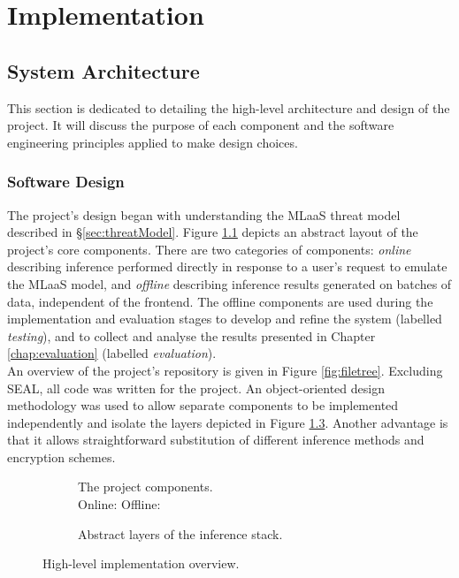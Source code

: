 \chapter{Implementation}
\label{chap:implementation}


\section{System Architecture}
\indent \indent
This section is dedicated to detailing the high-level architecture and design of the project. It will discuss the purpose of each component and the software engineering principles applied to make design choices.

\subsection{Software Design}
\indent \indent
The project's design began with understanding the MLaaS threat model described in §\ref{sec:threatModel}. Figure \ref{fig:abstractNetwork} depicts an abstract layout of the project's core components. There are two categories of components: \textit{online} describing inference performed directly in response to a user's request to emulate the MLaaS model, and \textit{offline} describing inference results generated on batches of data, independent of the frontend. The offline components are used during the implementation and evaluation stages to develop and refine the system (labelled \textit{testing}), and to collect and analyse the results presented in Chapter \ref{chap:evaluation} (labelled \textit{evaluation}).
\smallskip \\ \indent
An overview of the project's repository is given in Figure \ref{fig:filetree}. Excluding SEAL, all code was written for the project. An object-oriented design methodology was used to allow separate components to be implemented independently and isolate the layers depicted in Figure \ref{fig:abstraction}. Another advantage is that it allows straightforward substitution of different inference methods and encryption schemes.
\begin{figure}[ht]
    \begin{subfigure}[b]{0.5\textwidth}
        \centering
        \scalebox{0.3}{}
        \captionsetup{justification=centering}
        \caption[Project Components]{The project components.\medskip\\Online: \hl{\quad\quad\quad\quad} \quad Offline: \hl{\quad\quad\quad\quad}}
        \label{fig:abstractNetwork}
    \end{subfigure}%
    \begin{subfigure}[b]{0.5\textwidth}
        \centering
        \scalebox{0.53}{}
        \caption{Abstract layers of the inference stack.}
        \label{fig:abstractInference}
    \end{subfigure}%
    \caption{High-level implementation overview.}
    \label{fig:abstraction}
\end{figure}
